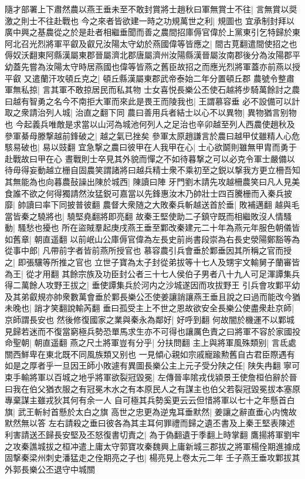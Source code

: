 隨才部署上下肅然農以燕王垂未至不敢封賞將士趙秋曰軍無賞士不往|{
	言無賞以奨激之則士不往赴戰也}
今之來者皆欲建一時之功規萬世之利|{
	規圖也}
宜承制封拜以廣中興之基農從之於是赴者相繼垂聞而善之農間招庫傉官偉於上黨東引乞特歸於東阿北召光烈將軍平叡及叡兄汝陽太守幼於燕國偉等皆應之|{
	間古莧翻遣間使招之也傉奴沃翻東阿縣漢屬東郡晉屬濟北郡唐屬濟州汝陽縣漢晉屬汝南郡後分為汝陽郡平幼蓋先嘗為汝陽太守時居燕國也偉等皆燕之舊臣故招之而應光烈將軍蓋亦前燕以授平叡}
又遣蘭汗攻頓丘克之|{
	頓丘縣漢屬東郡武帝泰始二年分置頓丘郡}
農號令整肅軍無私掠|{
	言其軍不敢掠居民而私其物}
士女喜悦長樂公丕使石越將步騎萬餘討之農曰越有智勇之名今不南拒大軍而來此是畏王而陵我也|{
	王謂慕容垂}
必不設備可以計取之衆請治列人城|{
	治直之翻下同}
農曰善用兵者結士以心不以異物|{
	異物猶言别物也}
今起義兵唯敵是求當以山河為城池何列人之足治也辛卯越至列人西農使趙秋及參軍綦母滕撃越前鋒破之|{
	越之氣已挫矣}
參軍太原趙謙言於農曰越甲仗雖精人心危駭易破也|{
	易以豉翻}
宜急撃之農曰彼甲在人我甲在心|{
	士心欲鬬則雖無甲胄而勇于赴戰故曰甲在心}
晝戰則士卒見其外貌而憚之不如待暮撃之可以必克令軍士嚴備以待毋得妄動越立栅自固農笑謂諸將曰越兵精士衆不乘初至之鋭以撃我方更立柵吾知其無能為也向暮農鼔譟出陳於城西|{
	陳讀曰陣}
牙門劉木請先攻越柵農笑曰凡人見美食誰不欲之何得獨請然汝猛鋭可嘉當以先鋒惠汝木乃帥壯士四百騰栅而入秦兵披靡|{
	帥讀曰率下同披普彼翻}
農督大衆随之大敗秦兵斬越送首於垂|{
	敗補邁翻}
越與毛當皆秦之驍將也|{
	驍堅堯翻將即亮翻}
故秦王堅使助二子鎮守既而相繼敗沒人情騷動|{
	騷愁也擾也}
所在盜賊羣起庚戌燕王垂至鄴改秦建元二十年為燕元年服色朝儀皆如舊章|{
	朝直遥翻}
以前岷山公庫傉官偉為左長史前尚書段崇為右長史滎陽鄭豁等為從事中郎|{
	凡帶前字者皆前燕所授官也}
慕容農引兵會垂於鄴垂因其所稱之官而授之|{
	即張驤等所推之官也}
立世子寶為太子封從弟拔等十七人及甥宇文輸舅子蘭審皆為王|{
	從才用翻}
其餘宗族及功臣封公者三十七人侯伯子男者八十九人可足渾譚集兵得二萬餘人攻野王拔之|{
	垂使譚集兵於河内之沙城遂因而攻拔野王}
引兵會攻鄴平幼及其弟叡規亦帥衆數萬會垂於鄴長樂公丕使姜讓誚讓燕王垂且說之曰過而能改今猶未晚也|{
	誚才笑翻說輸芮翻}
垂曰孤受主上不世之恩故欲安全長樂公使盡衆赴京師|{
	京師謂長安也}
然後修復國家之業與秦永為鄰好|{
	好呼到翻}
何故闇於機運不以鄴城見歸若迷而不復當窮極兵勢恐單馬求生亦不可得也讓厲色責之曰將軍不容於家國投命聖朝|{
	朝直遥翻}
燕之尺土將軍豈有分乎|{
	分扶問翻}
主上與將軍風殊類别|{
	言氐處關西鮮卑在東北既不同風族類又别也}
一見傾心親如宗戚寵踰勲舊自古君臣際遇有如是之厚者乎一旦因王師小敗遽有異圖長樂公主上元子受分陕之任|{
	陕失冉翻}
寧可束手輸將軍以百城之地乎將軍欲裂冠毀冕|{
	左傳晉率隂戎伐潁景王使詹桓伯辭於晉曰我在伯父猶衣服之有冠冕木水之有本原民人之有謀主也伯父若裂冠毀冕拔本塞原專棄謀主雖戎狄其何有余一人}
自可極其兵勢奚更云云但惜將軍以七十之年懸首白旗|{
	武王斬紂首懸於太白之旗}
高世之忠更為逆鬼耳垂默然|{
	姜讓之辭直垂心内愧故默然無以答}
左右請殺之垂曰彼各為其主耳何罪禮而歸之遺丕書及上秦王堅表陳述利害請送丕歸長安堅及丕怒復書切責之|{
	為于偽翻遺于季翻上時掌翻}
鷹揚將軍劉牢之攻秦譙城拔之桓冲遣上庸太守郭寶攻秦魏興上庸新城三郡拔之將軍楊佺期進據成固撃秦梁州刺史潘猛走之佺期亮之子也|{
	楊亮見上卷太元二年}
壬子燕王垂攻鄴拔其外郭長樂公丕退守中城關

